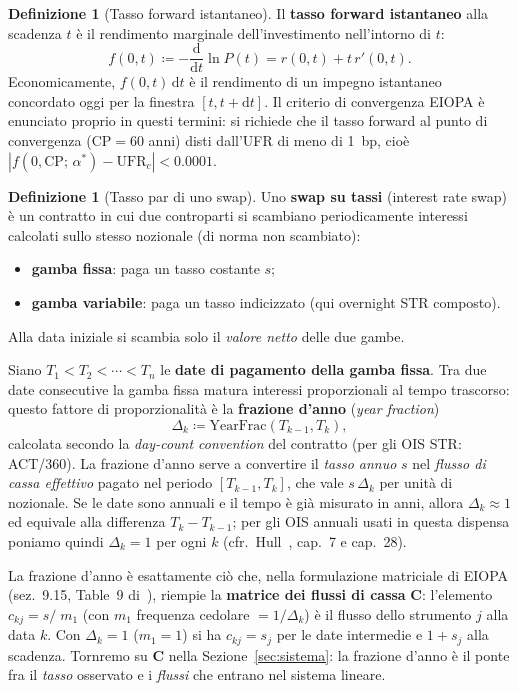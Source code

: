 \documentclass[11pt,a4paper]{article}
\theoremstyle{plain}
\theoremstyle{definition}
\newtheorem{definizione}[teorema]{Definizione}
\theoremstyle{remark}
\newcommand{\UFR}{\ensuremath{\mathrm{UFR}}}
\newcommand{\CP}{\ensuremath{\mathrm{CP}}}
\newcommand{\Cmat}{\mathbf{C}}
\newcommand{\defeq}{\coloneqq}
\begin{document}
\begin{definizione}[Tasso forward istantaneo]
Il \textbf{tasso forward istantaneo} alla scadenza $t$ \`e il rendimento
marginale dell'investimento nell'intorno di $t$:
\[
  f(0,t) \defeq -\frac{\mathrm{d}}{\mathrm{d}t}\ln P(t)
               = r(0,t) + t\,r'(0,t).
\]
Economicamente, $f(0,t)\,\mathrm{d}t$ \`e il rendimento di un impegno
istantaneo concordato oggi per la finestra $[t,t+\mathrm{d}t]$.
Il criterio di convergenza EIOPA \`e enunciato proprio in questi termini:
si richiede che il tasso forward al punto di convergenza
($\CP=60$ anni) disti dall'UFR di meno di 1~bp, cio\`e
$|f(0,\CP;\,\alpha^*) - \UFR_c| < 0.0001$.
\end{definizione}

\begin{definizione}[Tasso par di uno swap]
\label{def:tasso_par}
Uno \textbf{swap su tassi} (interest rate swap) \`e un contratto in cui due
controparti si scambiano periodicamente interessi calcolati sullo stesso
nozionale (di norma non scambiato):
\begin{itemize}
  \item \textbf{gamba fissa}: paga un tasso costante $s$;
  \item \textbf{gamba variabile}: paga un tasso indicizzato (qui overnight \texteuro{}STR composto).
\end{itemize}
Alla data iniziale si scambia solo il \emph{valore netto} delle due gambe.

Siano $T_1 < T_2 < \cdots < T_n$ le \textbf{date di pagamento della gamba fissa}.
Tra due date consecutive la gamba fissa matura interessi proporzionali al tempo
trascorso: questo fattore di proporzionalità è la \textbf{frazione d'anno}
(\emph{year fraction})
\[
  \Delta_k \defeq \text{YearFrac}(T_{k-1},T_k),
\]
calcolata secondo la \emph{day-count convention} del contratto (per gli OIS
\texteuro{}STR: ACT/360). La frazione d'anno serve a convertire il \emph{tasso
annuo} $s$ nel \emph{flusso di cassa effettivo} pagato nel periodo $[T_{k-1},T_k]$,
che vale $s\,\Delta_k$ per unità di nozionale. Se le date sono annuali e il tempo
è già misurato in anni, allora $\Delta_k\approx 1$ ed equivale alla differenza
$T_k-T_{k-1}$; per gli OIS annuali usati in questa dispensa poniamo quindi
$\Delta_k = 1$ per ogni $k$ (cfr.\ Hull~\cite{hull2018}, cap.~7 e cap.~28).

\begin{keybox}[Dalla frazione d'anno alla matrice dei flussi $\Cmat$]
La frazione d'anno è esattamente ciò che, nella formulazione matriciale di EIOPA
(sez.~9.15, Table~9 di~\cite{eiopa2025}), riempie la \textbf{matrice dei flussi di
cassa} $\Cmat$: l'elemento $c_{kj}=s/\!\!\;m_{1}$ (con $m_1$ frequenza cedolare
$=1/\Delta_k$) è il flusso dello strumento $j$ alla data $k$. Con $\Delta_k=1$
($m_1=1$) si ha $c_{kj}=s_j$ per le date intermedie e $1+s_j$ alla scadenza.
Tornremo su $\Cmat$ nella Sezione~\ref{sec:sistema}: la frazione d'anno è il ponte
fra il \emph{tasso} osservato e i \emph{flussi} che entrano nel sistema lineare.
\end{keybox}


\end{definizione}
\end{document}
